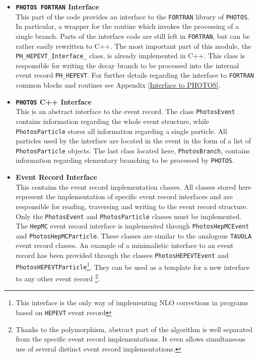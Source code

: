 \documentclass[]{Photos_interface_design}
\begin{document}
\begin{itemize}
  \item {\bf {\tt PHOTOS FORTRAN} Interface}\\
       This part of the code provides an interface 
       to the {\tt FORTRAN} library of {\tt PHOTOS}. In particular,
	   a wrapper for the routine which invokes the processing
	   of a single branch. Parts of the interface code are still left in {\tt FORTRAN}, but
	   can be rather easily rewritten to C++. 
       The most important part of this module, the {\tt PH\_HEPEVT\_Interface\_} class,
       is already implemented  in C++. This class is responsible for writing
	   the decay branch to be processed into the internal event record {\tt PH\_HEPEVT}.
       For further details regarding the interface to {\tt FORTRAN}
	   common blocks and routines see Appendix \ref{Interface to PHOTOS}.
  \item {\bf {\tt PHOTOS} C++ Interface} \\
       This is an abstract interface to the event record.
       The class {\tt PhotosEvent} contains information regarding the whole event
       structure, while {\tt PhotosParticle} stores all information regarding a single particle.
       All particles used by the interface are located in the event in the form of
       a list of {\tt PhotosParticle} objects.
       The last class located here, {\tt PhotosBranch}, contains information regarding
	 elementary branching to be processed by {\tt PHOTOS}.
  \item {\bf Event Record Interface} \\
       This contains the event record implementation classes. All classes stored here represent
       the implementation of specific event record interfaces and are responsible for reading,
       traversing and writing to the event record structure.
       Only the {\tt PhotosEvent} and {\tt PhotosParticle} classes must be implemented.
       The {\tt HepMC} event record interface is implemented
       through {\tt PhotosHepMCEvent} and {\tt PhotosHepMCParticle}. These classes are similar to the
       analogous {\tt TAUOLA} \cite{Davidson:2010rw} event record classes.
       An example of a minimalistic interface to an event record has been provided
       through the classes {\tt PhotosHEPEVTEvent} and {\tt PhotosHEPEVTParticle}\footnote{This interface is the only way of implementing NLO corrections in programs based on {\tt HEPEVT} event record}.
       They can be used as a template for a new interface to any other event record%
       \footnote{Thanks to the polymorphism, abstract part of the algorithm
       is well separated from the specific event record implementations.
       It even allows simultaneous use of several distinct event record implementations.}.
\end{itemize}
\end{document}
